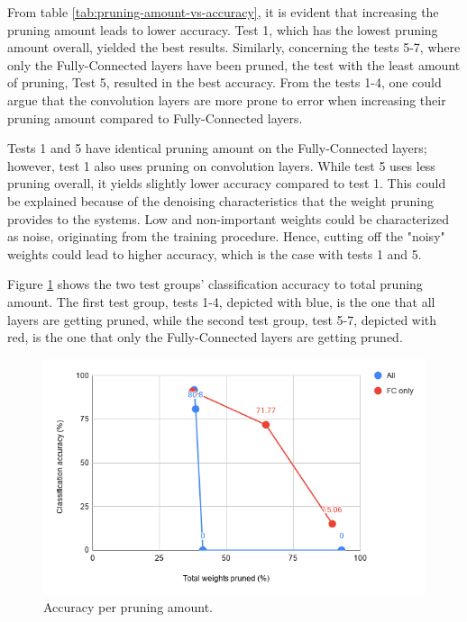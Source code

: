 From table \ref{tab:pruning-amount-vs-accuracy}, it is evident that increasing the pruning amount leads to lower accuracy. Test 1, which has the lowest pruning amount overall, yielded the best results. Similarly, concerning the tests 5-7, where only the Fully-Connected layers have been pruned, the test with the least amount of pruning, Test 5, resulted in the best accuracy. From the tests 1-4, one could argue that the convolution layers are more prone to error when increasing their pruning amount compared to Fully-Connected layers.

Tests 1 and 5 have identical pruning amount on the Fully-Connected layers; however, test 1 also uses pruning on convolution layers. While test 5 uses less pruning overall, it yields slightly lower accuracy compared to test 1. This could be explained because of the denoising characteristics that the weight pruning provides to the systems. Low and non-important weights could be characterized as noise, originating from the training procedure. Hence, cutting off the "noisy" weights could lead to higher accuracy, which is the case with tests 1 and 5.

Figure \ref{fig:pruning-amount-vs-accuracy} shows the two test groups' classification accuracy to total pruning amount. The first test group, tests 1-4, depicted with blue, is the one that all layers are getting pruned, while the second test group, test 5-7, depicted with red, is the one that only the Fully-Connected layers are getting pruned.

\begin{figure} [H]
	\centering
	\includegraphics[width=\textwidth]{../Images/Weights-distributions/pruned/pruning-amount-vs-accuracy-chart.png}
	\decoRule
	\caption[Accuracy per pruning amount]{Accuracy per pruning amount.}
	\label{fig:pruning-amount-vs-accuracy}
\end{figure}

